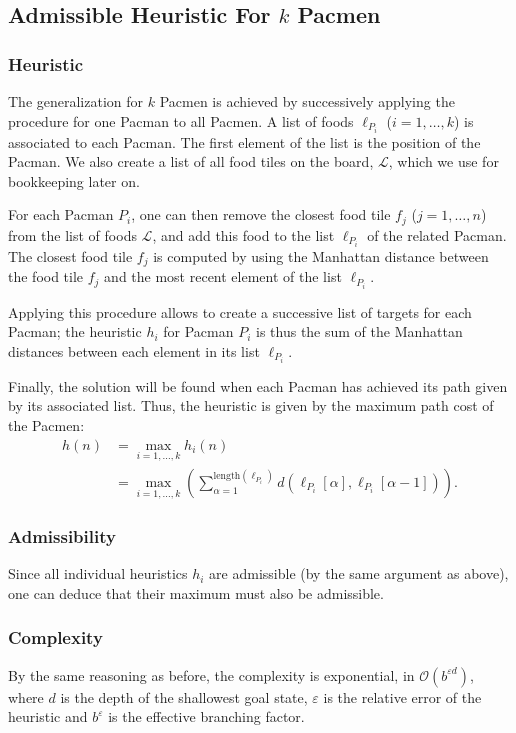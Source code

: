 \documentclass[journal]{IEEEtran}
\begin{document}
\subsection{Admissible Heuristic For \(k\) Pacmen}
\subsubsection{Heuristic}
The generalization for $k$ Pacmen is achieved by successively applying the procedure for one Pacman to all Pacmen.
A list of foods $\ell_{P_i}$ ($i=1,\dots,k$) is associated to each Pacman.
The first element of the list is the position of the Pacman.
We also create a list of all food tiles on the board, \(\mathscr{L}\), which we use for bookkeeping later on.

For each Pacman $P_i$, one can then remove the closest food tile $f_j$ ($j=1,\dots,n$) from the list of foods \(\mathscr{L}\), and add this food to the list $\ell_{P_i}$ of the related Pacman.
The closest food tile $f_j$ is computed by using the Manhattan distance between the food tile $f_j$ and the most recent element of the list $\ell_{P_i}$.

Applying this procedure allows to create a successive list of targets for each Pacman; the heuristic \(h_i\) for Pacman $P_i$ is thus the sum of the Manhattan distances between each element in its list $\ell_{P_i}$.

Finally, the solution will be found when each Pacman has achieved its path given by its associated list.
Thus, the heuristic is given by the maximum path cost of the Pacmen:
\begin{align*}
 h(n) &= \max_{i = 1,\ldots,k} h_i(n) \\
 &= \max_{i=1,\ldots, k} \left(\sum_{\alpha=1}^{\mathrm{length}(\ell_{P_i})} d\left(\ell_{P_i}[\alpha],\ell_{P_i}[\alpha-1]\right)\right).
\end{align*}

\subsubsection{Admissibility}
Since all individual heuristics \(h_i\) are admissible (by the same argument as above), one can deduce that their maximum must also be admissible.

\subsubsection{Complexity}
By the same reasoning as before, the complexity is exponential, in \(\mathcal{O}(b^{\varepsilon d})\), where \(d\) is the depth of the shallowest goal state, \(\varepsilon\) is the relative error of the heuristic and \(b^\varepsilon\) is the effective branching factor.
\end{document}
